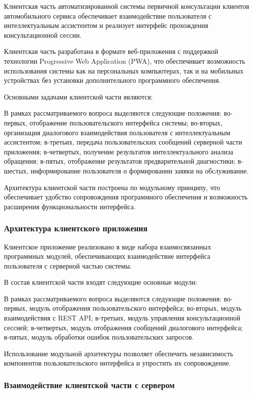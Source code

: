 \documentclass[14pt,a4paper]{extarticle}
\numberwithin{figure}{section}
\numberwithin{table}{section}
\begin{document}
Клиентская часть автоматизированной системы первичной консультации
клиентов автомобильного сервиса обеспечивает взаимодействие пользователя
с интеллектуальным ассистентом и реализует интерфейс прохождения
консультационной сессии.

Клиентская часть разработана в формате веб-приложения с поддержкой
технологии Progressive Web Application (PWA), что обеспечивает
возможность использования системы как на персональных компьютерах, так и
на мобильных устройствах без установки дополнительного программного
обеспечения.

Основными задачами клиентской части являются:


В рамках рассматриваемого вопроса выделяются следующие положения: во-первых, отображение пользовательского интерфейса системы; во-вторых, организация диалогового взаимодействия пользователя с интеллектуальным ассистентом; в-третьих, передача пользовательских сообщений серверной части приложения; в-четвертых, получение результатов интеллектуального анализа обращения; в-пятых, отображение результатов предварительной диагностики; в-шестых, информирование пользователя о формировании заявки на обслуживание.


Архитектура клиентской части построена по модульному принципу, что
обеспечивает удобство сопровождения программного обеспечения и
возможность расширения функциональности интерфейса.

\subsubsection{Архитектура клиентского приложения}

Клиентское приложение реализовано в виде набора взаимосвязанных
программных модулей, обеспечивающих взаимодействие интерфейса
пользователя с серверной частью системы.

В состав клиентской части входят следующие основные модули:


В рамках рассматриваемого вопроса выделяются следующие положения: во-первых, модуль отображения пользовательского интерфейса; во-вторых, модуль взаимодействия с REST API; в-третьих, модуль управления консультационной сессией; в-четвертых, модуль отображения сообщений диалогового интерфейса; в-пятых, модуль обработки ошибок пользовательских запросов.


Использование модульной архитектуры позволяет обеспечить независимость
компонентов пользовательского интерфейса и упростить их сопровождение.

\subsubsection{Взаимодействие клиентской части с сервером}
\end{document}

